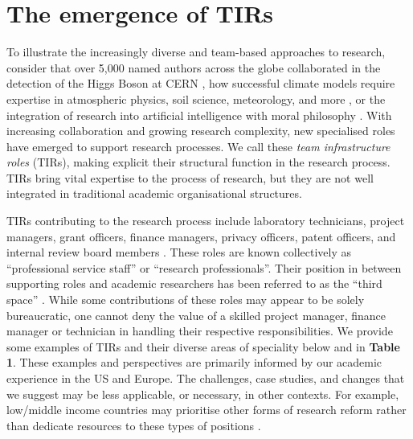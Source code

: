 \documentclass[authordate,meta,issue]{jote-new-article}
\begin{document}
\section{The emergence of TIRs}







To illustrate the increasingly diverse and team-based approaches to research, consider that over 5,000 named authors across the globe collaborated in the detection of the Higgs Boson at CERN \parencites{Castelvecchi2015}, how successful climate models require expertise in atmospheric physics, soil science, meteorology, and more \parencites{Huebner2017}, or the integration of research into artificial intelligence with moral philosophy \parencites{Jobin2019}. With increasing collaboration and growing research complexity, new specialised roles have emerged to support research processes. We call these \emph{team infrastructure roles }(TIRs), making explicit their structural function in the research process. TIRs bring vital expertise to the process of research, but they are not well integrated in traditional academic organisational structures.











TIRs contributing to the research process include laboratory technicians, project managers, grant officers, finance managers, privacy officers, patent officers, and internal review board members \parencites{Heffner1979}{UKRI2023}. These roles are known collectively as “professional service staff” or “research professionals”. Their position in between supporting roles and academic researchers has been referred to as the “third space” \parencites{Whitchurch2008}. While some contributions of these roles may appear to be solely bureaucratic, one cannot deny the value of a skilled project manager, finance manager or technician in handling their respective responsibilities. We provide some examples of TIRs and their diverse areas of speciality below and in \textbf{Table 1}. These examples and perspectives are primarily informed by our academic experience in the US and Europe. The challenges, case studies, and changes that we suggest may be less applicable, or necessary, in other contexts. For example, low/middle income countries may prioritise other forms of research reform rather than dedicate resources to these types of positions \parencites{Bezuidenhout2018}{Bezuidenhout2017}{Onie2020}.
\end{document}
